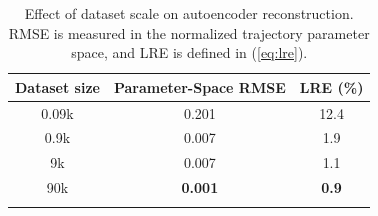 \documentclass[letterpaper, 10 pt, conference]{ieeeconf}  %
\begin{document}

\begin{table}[t]
\centering
\caption{Effect of dataset scale on autoencoder reconstruction.
RMSE is measured in the normalized trajectory parameter space, and LRE is defined in (\ref{eq:lre}).}
\renewcommand{\arraystretch}{1.1}
\setlength{\tabcolsep}{8pt}
\begin{tabular}{ccc}
\Xhline{1.2pt}
\textbf{Dataset size} & \textbf{Parameter-Space RMSE} & \textbf{LRE (\%)} \\
\hline
0.09k  & 0.201 & 12.4 \\
0.9k  & 0.007 & 1.9 \\
9k    & 0.007 & 1.1  \\
90k   & \textbf{0.001} & \textbf{0.9}  \\
\Xhline{1.2pt}
\end{tabular}
\label{tab:ablation_scale}
\vspace{-10pt}
\end{table}
\end{document}
